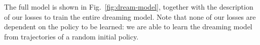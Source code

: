 \documentclass[letterpaper, 10 pt, conference]{ieeeconf}
\begin{document}






The full model is shown in Fig.~\ref{fig:dream-model}, together with the description of our losses to train the entire dreaming model. Note that none of our losses are dependent on the policy to be learned: we are able to learn the dreaming model from trajectories of a random initial policy.
\end{document}
